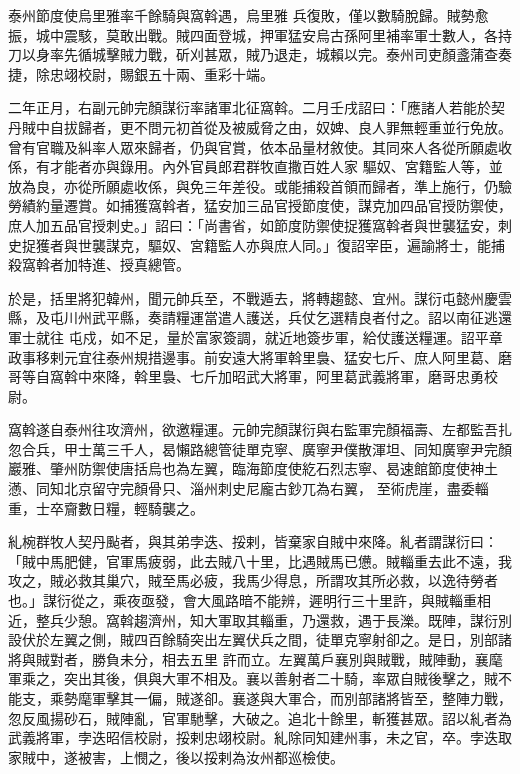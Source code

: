 \begin{pinyinscope}
 泰州節度使烏里雅率千餘騎與窩斡遇，烏里雅
 兵復敗，僅以數騎脫歸。賊勢愈振，城中震駭，莫敢出戰。賊四面登城，押軍猛安烏古孫阿里補率軍士數人，各持刀以身率先循城擊賊力戰，斫刈甚眾，賊乃退走，城賴以完。泰州司吏顏盞蒲查奏捷，除忠翊校尉，賜銀五十兩、重彩十端。



 二年正月，右副元帥完顏謀衍率諸軍北征窩斡。二月壬戌詔曰：「應諸人若能於契丹賊中自拔歸者，更不問元初首從及被威脅之由，奴婢、良人罪無輕重並行免放。曾有官職及糾率人眾來歸者，仍與官賞，依本品量材敘使。其同來人各從所願處收係，有才能者亦與錄用。內外官員郎君群牧直撒百姓人家
 驅奴、宮籍監人等，並放為良，亦從所願處收係，與免三年差役。或能捕殺首領而歸者，準上施行，仍驗勞績約量遷賞。如捕獲窩斡者，猛安加三品官授節度使，謀克加四品官授防禦使，庶人加五品官授刺史。」詔曰：「尚書省，如節度防禦使捉獲窩斡者與世襲猛安，刺史捉獲者與世襲謀克，驅奴、宮籍監人亦與庶人同。」復詔宰臣，遍諭將士，能捕殺窩斡者加特進、授真總管。



 於是，括里將犯韓州，聞元帥兵至，不戰遁去，將轉趨懿、宜州。謀衍屯懿州慶雲縣，及屯川州武平縣，奏請糧運當遣人護送，兵仗乞選精良者付之。詔以南征逃還軍士就往
 屯戍，如不足，量於富家簽調，就近地簽步軍，給仗護送糧運。詔平章政事移剌元宜往泰州規措邊事。前安遠大將軍斡里裊、猛安七斤、庶人阿里葛、磨哥等自窩斡中來降，斡里裊、七斤加昭武大將軍，阿里葛武義將軍，磨哥忠勇校尉。



 窩斡遂自泰州往攻濟州，欲邀糧運。元帥完顏謀衍與右監軍完顏福壽、左都監吾扎忽合兵，甲士萬三千人，曷懶路總管徒單克寧、廣寧尹僕散渾坦、同知廣寧尹完顏巖雅、肇州防禦使唐括烏也為左翼，臨海節度使紇石烈志寧、曷速館節度使神土懣、同知北京留守完顏骨只、淄州刺史尼龐古鈔兀為右翼，
 至術虎崖，盡委輜重，士卒齎數日糧，輕騎襲之。



 糺椀群牧人契丹颭者，與其弟孛迭、挼剌，皆棄家自賊中來降。糺者謂謀衍曰：「賊中馬肥健，官軍馬疲弱，此去賊八十里，比遇賊馬已憊。賊輜重去此不遠，我攻之，賊必救其巢穴，賊至馬必疲，我馬少得息，所謂攻其所必救，以逸待勞者也。」謀衍從之，乘夜亟發，會大風路暗不能辨，遲明行三十里許，與賊輜重相近，整兵少憩。窩斡趨濟州，知大軍取其輜重，乃還救，遇于長濼。既陣，謀衍別設伏於左翼之側，賊四百餘騎突出左翼伏兵之間，徒單克寧射卻之。是日，別部諸將與賊對者，勝負未分，相去五里
 許而立。左翼萬戶襄別與賊戰，賊陣動，襄麾軍乘之，突出其後，俱與大軍不相及。襄以善射者二十騎，率眾自賊後擊之，賊不能支，乘勢麾軍擊其一偏，賊遂卻。襄遂與大軍合，而別部諸將皆至，整陣力戰，忽反風揚砂石，賊陣亂，官軍馳擊，大破之。追北十餘里，斬獲甚眾。詔以糺者為武義將軍，孛迭昭信校尉，挼剌忠翊校尉。糺除同知建州事，未之官，卒。孛迭取家賊中，遂被害，上憫之，後以挼剌為汝州都巡檢使。



\end{pinyinscope}
